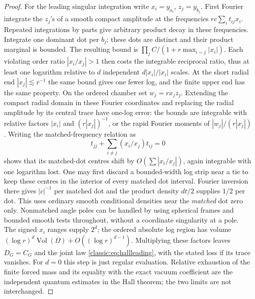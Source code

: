 \begin{proof}
For the leading singular integration write
\(x_i=y_{a_i}\), \(z_j=y_{b_j}\).
First Fourier integrate the \(z_j\)'s of a smooth compact
amplitude at the frequencies
\(r c\sum_i t_{ij}x_i\). Repeated integrations by parts
give arbitrary product decay in these frequencies. Integrate
one dominant dot per \(b_j\); these dots are distinct and
their product marginal is bounded. The resulting bound is
\(\prod_j C/(1+r\max_{i\sim j}|x_i|)\).
Each violating order ratio \(|x_i/x_j|>1\) then costs
the integrable reciprocal ratio, thus at least one logarithm
relative to \(d\) independent \(d|x_i|/|x_i|\) scales.
At the short radial end \(|x_j|\lesssim r^{-1}\) the
same bound gives one fewer log, and the finite upper end
has the same property. On the ordered chamber set
\(w_j=rx_j z_j\). Extending the compact radial domain in
these Fourier coordinates and replacing the radial amplitude
by its central trace have one-log error: the bounds
are integrable with relative factors \(|x_i|\) and
\((r|x_j|)^{-1}\), or the rapid Fourier moments of
\(|w_j|/(r|x_j|)\). Writing the matched-frequency relation
as
\[
 t_{jj}+\sum_{i\ne j}(x_i/x_j)t_{ij}=0
\]
shows that its matched-dot centres shift by
\(O(\sum |x_i/x_j|)\), again integrable with one logarithm
lost. One may first discard a bounded-width log strip near a
tie to keep these centres in the interior of every matched
dot interval. Fourier inversion there gives \(|c|^{-1}\)
per matched dot and the product density \(dt/2\) supplies
\(1/2\) per dot. This uses ordinary smooth conditional
densities near the \emph{matched} dot zero only. Nonmatched
angle poles can be handled by using spherical frames and
bounded smooth tests throughout, without a coordinate
singularity at a pole. The signed \(x_i\) ranges supply
\(2^d\); the ordered absolute log region has volume
\((\log r)^d\operatorname{Vol}(\Omega)+O((\log r)^{d-1})\).
Multiplying these factors leaves \(D_G=C_G\) and the
joint law \eqref{classic:eq:hallleading}, with the stated
loss if its trace vanishes. For \(d=0\) this step is
just regular evaluation. Relative exhaustion of the
finite forced mass and its equality with the exact
vacuum coefficient are the independent quantum estimates
in the Hall theorem; the two limits are not interchanged.
\end{proof}

